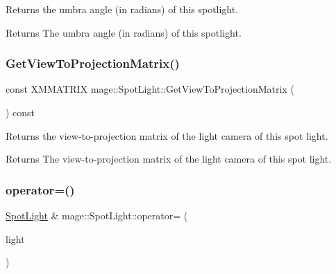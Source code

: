 Returns the umbra angle (in radians) of this spotlight.

\begin{DoxyReturn}{Returns}
The umbra angle (in radians) of this spotlight. 
\end{DoxyReturn}
\hypertarget{classmage_1_1_spot_light_abc2634b5fb5902100eb6f51127bae15e}{}\label{classmage_1_1_spot_light_abc2634b5fb5902100eb6f51127bae15e} 
\subsubsection{\texorpdfstring{Get\+View\+To\+Projection\+Matrix()}{GetViewToProjectionMatrix()}}
{\footnotesize\ttfamily const X\+M\+M\+A\+T\+R\+IX mage\+::\+Spot\+Light\+::\+Get\+View\+To\+Projection\+Matrix (\begin{DoxyParamCaption}{ }\end{DoxyParamCaption}) const\hspace{0.3cm}{\ttfamily [noexcept]}}

Returns the view-\/to-\/projection matrix of the light camera of this spot light.

\begin{DoxyReturn}{Returns}
The view-\/to-\/projection matrix of the light camera of this spot light. 
\end{DoxyReturn}
\hypertarget{classmage_1_1_spot_light_a04a23d643186a58fb3a03d0a73a63e39}{}\label{classmage_1_1_spot_light_a04a23d643186a58fb3a03d0a73a63e39} 
\subsubsection{\texorpdfstring{operator=()}{operator=()}\hspace{0.1cm}{\footnotesize\ttfamily [1/2]}}
{\footnotesize\ttfamily \hyperlink{classmage_1_1_spot_light}{Spot\+Light} \& mage\+::\+Spot\+Light\+::operator= (\begin{DoxyParamCaption}\item[{const \hyperlink{classmage_1_1_spot_light}{Spot\+Light} \&}]{light }\end{DoxyParamCaption})\hspace{0.3cm}{\ttfamily [default]}}

